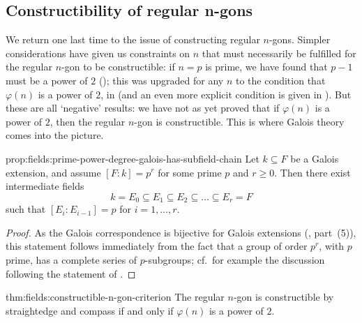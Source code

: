 \subsection{Constructibility of regular n-gons}
\label{subsec:fields:constructibility-of-regular-n-gons}
We return one last time to the issue of constructing regular $n$-gons.
Simpler considerations have given us constraints on $n$ that must
necessarily be fulfilled for the regular $n$-gon to be constructible:
if $n = p$ is prime, we have found that $p - 1$ must be a power of $2$
(); this was upgraded
for any $n$ to the condition that $\varphi(n)$ is a power of $2$, in
 (and an even
more explicit condition is given in
). But
these are all `negative' results: we have not as yet proved that if
$\varphi(n)$ is a power of $2$, then the regular $n$-gon is
constructible. This is where Galois theory comes into the picture.
\begin{prop}{}{prop:fields:prime-power-degree-galois-has-subfield-chain}
  Let $k \subseteq F$ be a Galois extension, and assume
  $[F : k] = p^r$ for some prime $p$ and $r \geq 0$. Then there exist
  intermediate fields
  \[
    k = E_0 \subseteq E_1 \subseteq E_2 \subseteq \dots \subseteq E_r
    = F
  \]
  such that $[E_i : E_{i-1}] = p$ for $i = 1, \dots, r$.
\end{prop}

\begin{proof}
  As the Galois correspondence is bijective for Galois extensions
  (, part~(5)), this statement follows
  immediately from the fact that a group of order $p^r$, with $p$
  prime, has a complete series of $p$-subgroups; cf.\ for example the
  discussion following the statement of .
\end{proof}
\begin{thm}{}{thm:fields:constructible-n-gon-criterion}
  The regular $n$-gon is constructible by straightedge and compass if
  and only if $\varphi(n)$ is a power of $2$.
\end{thm}

